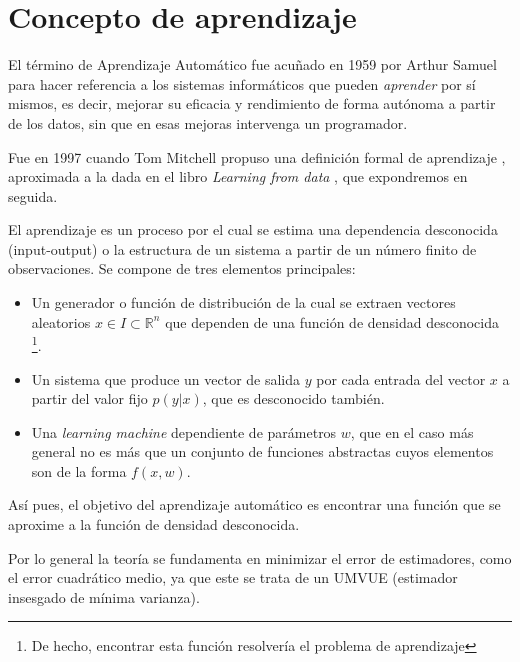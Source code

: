 %

\section{Concepto de aprendizaje}\label{ch:Aprendizaje}

El término de Aprendizaje Automático 
\cite{hisour} 
fue acuñado en 1959 por Arthur Samuel 
para hacer referencia a los sistemas informáticos que 
pueden \textit{aprender} por sí mismos, es decir, mejorar su 
eficacia y rendimiento de forma autónoma a partir de los datos, 
sin que en esas mejoras intervenga un programador.

Fue en 1997 cuando Tom Mitchell propuso una definición 
formal de aprendizaje 
\cite{tom-michell-machine-learning}, 
aproximada a la dada en el libro \textit{Learning from data}
\cite{learning-from-data-1-2}, que expondremos en seguida.

El aprendizaje es un proceso por el cual se estima una dependencia desconocida 
(input-output) o la estructura de un sistema a partir de un número finito de 
observaciones. Se compone de tres elementos principales: 

\begin{itemize}
    \item Un generador o función de distribución de la cual se extraen 
    vectores aleatorios 
    $x \in I \subset \mathbb R^ n$ 
    que dependen de una función de densidad desconocida \footnote{De hecho, encontrar esta función resolvería el problema de aprendizaje}.
    
    \item Un sistema que produce un vector de salida $y$ por cada entrada del vector $x$ a partir del valor fijo $p(y|x)$, que es desconocido también. 
    
    \item Una \textit{learning machine} dependiente de parámetros $w$, que en el caso más general no es  más que un conjunto de funciones abstractas cuyos elementos son de la forma $f(x,w)$.
\end{itemize}



Así pues, el objetivo del aprendizaje automático es encontrar una función que se aproxime a la función de densidad desconocida.

Por lo general la teoría se fundamenta en minimizar el error de estimadores, como el error cuadrático medio, ya que este se trata de un UMVUE  (estimador insesgado de mínima varianza). 

